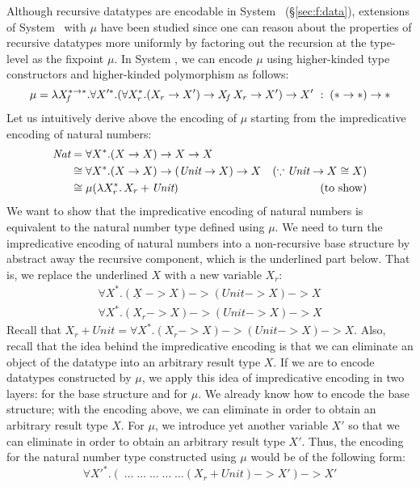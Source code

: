 Although recursive datatypes are encodable in System \F\ (\S\ref{sec:f:data}),
extensions of System \F\ with $\mu$ have been studied %
since one can reason about the properties of recursive datatypes more
uniformly by factoring out the recursion at the type-level as
the fixpoint $\mu$. In System \Fw, we can encode $\mu$ using
higher-kinded type constructors and higher-kinded polymorphism as follows:
\[
\mu =
 \lambda X_{\!f}^{* -> *}.
 \forall X'^{*}.(\forall X_r^{*}.(X_r -> X') -> X_{\!f}\,X_r -> X') -> X'
 ~:\; (* -> *) -> *
\]
Let us intuitively derive above the encoding of $\mu$ starting from
the impredicative encoding of natural numbers:
\begin{align*}
\textit{Nat}
        &= \forall X^{*} . (X -> X) -> X -> X \\
        &\cong \forall X^{*} . (X -> X) -> (\textit{Unit} -> X) -> X 
                &(\because \textit{Unit} -> X \cong X) \\
        &\cong \mu(\lambda X_r^{*}.\,X_r + \textit{Unit})
                & (\text{to show})
\end{align*}
We want to show that the impredicative encoding of natural numbers is
equivalent to the natural number type defined using $\mu$. We need to turn
the impredicative encoding of natural numbers into a non-recursive
base structure by abstract away the recursive component, which is
the underlined part below. That is, we replace the underlined $X$
with a new variable $X_r$:
\begin{align*}
\forall X^{*} . (\underline{X}\; -> X) -> (\textit{Unit} -> X) -> X \\
\forall X^{*} . (X_r -> X) -> (\textit{Unit} -> X) -> X
\end{align*}
Recall that
$X_r +\textit{Unit} = \forall X^{*} . (X_r -> X) -> (\textit{Unit} -> X) -> X$.
Also, recall that the idea behind the impredicative encoding is that
we can eliminate an object of the datatype into an arbitrary result type $X$.
If we are to encode datatypes constructed by $\mu$, we apply this idea of
impredicative encoding in two layers: for the base structure and for $\mu$.
We already know how to encode the base structure; with the encoding above,
we can eliminate in order to obtain an arbitrary result type $X$. For $\mu$,
we introduce yet another variable $X'$ so that we can eliminate in order to
obtain an arbitrary result type $X'$. Thus, the encoding for
the natural number type constructed using $\mu$ would be of the following form:
\[ \forall X'^{*}.(\;\dots\;\dots\;\dots\;\dots\;\dots (X_r + \textit{Unit}) -> X') -> X' \]
